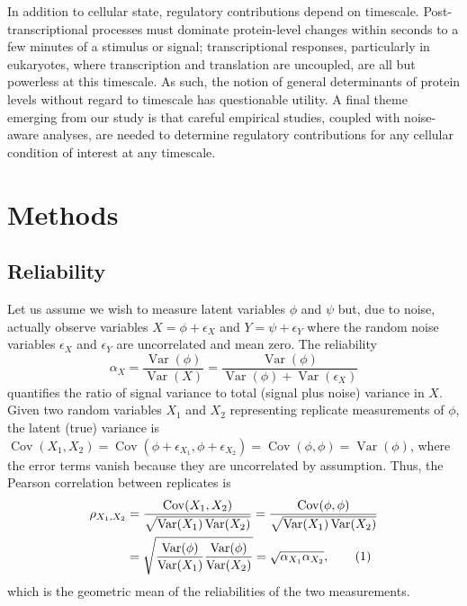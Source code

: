 \documentclass[10pt]{article}
\DeclareMathOperator{\Cov}{Cov}
\DeclareMathOperator{\Var}{Var}
\newcommand\numberthis{\addtocounter{equation}{1}\tag{\theequation}}
\begin{document}
In addition to cellular
state, regulatory contributions depend on timescale.  Post-transcriptional
processes must dominate protein-level changes within seconds to a few minutes
of a stimulus or signal; transcriptional responses, particularly in eukaryotes, where transcription and translation are uncoupled,
are all but powerless at this
timescale. As such, the notion of general determinants of protein levels
without regard to timescale has questionable utility. A final theme emerging from
our study is that careful empirical studies, coupled with noise-aware analyses,
are needed to determine regulatory contributions for any cellular condition of
interest at any timescale.







\section*{Methods}

\subsection*{Reliability}

Let us assume we wish to measure latent variables $\phi$ and $\psi$ but, due to
noise, actually observe variables $X = \phi+\epsilon_X$ and $Y=
\psi+\epsilon_Y$ where the random noise variables $\epsilon_X$ and $\epsilon_Y$
are uncorrelated and mean zero.
The reliability
\begin{equation}
\alpha_X=\frac{\Var(\phi)}{\Var(X)} =
\frac{\Var(\phi)}{\Var(\phi) + \Var(\epsilon_X)}
\end{equation}
quantifies the ratio of signal variance to total (signal plus
noise) variance in $X$. Given two random variables $X_1$ and $X_2$
representing replicate measurements of $\phi$, the latent (true)
variance is
$\Cov(X_1,X_2)=\Cov(\phi+\epsilon_{X_1},\phi+\epsilon_{X_2}
)=\Cov(\phi,\phi)=\Var(\phi)$, where the error terms vanish because
they are uncorrelated by assumption. Thus, the Pearson correlation between
replicates is
\begin{align*}
\rho_{X_1,X_2} & = \frac{\Cov(X_1,X_2)}{\sqrt{\Var(X_1) \Var(X_2)}}
 = \frac{\Cov(\phi,\phi)}{\sqrt{\Var(X_1) \Var(X_2)}} \\
 & =\sqrt{\frac{\Var(\phi)}{\Var(X_1)} \frac{\Var(\phi)}{\Var(X_2)}}
 = \sqrt{\alpha_{X_1}\alpha_{X_2}}, \numberthis
\end{align*}
which is the geometric mean of the reliabilities of the two measurements.
\end{document}
